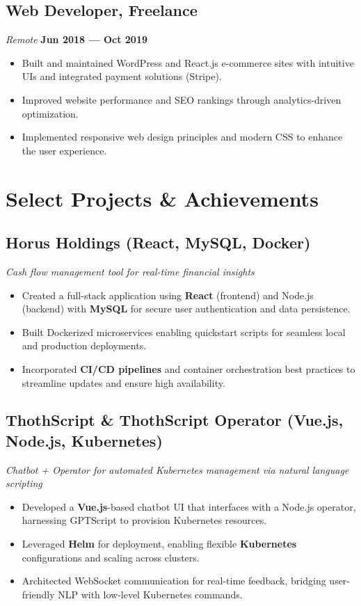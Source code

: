 \documentclass[a4paper,10pt]{article}
\begin{document}
\subsection*{Web Developer, Freelance}
\textit{Remote} \hfill \textbf{Jun 2018 — Oct 2019}
\begin{itemize}[leftmargin=1.5em]
    \item Built and maintained WordPress and React.js e-commerce sites with intuitive UIs and integrated payment solutions (Stripe).
    \item Improved website performance and SEO rankings through analytics-driven optimization.
    \item Implemented responsive web design principles and modern CSS to enhance the user experience.
\end{itemize}

\section*{Select Projects \& Achievements}

\subsection*{Horus Holdings (React, MySQL, Docker)}
\textit{Cash flow management tool for real-time financial insights}
\begin{itemize}[leftmargin=1.5em]
    \item Created a full-stack application using \textbf{React} (frontend) and Node.js (backend) with \textbf{MySQL} for secure user authentication and data persistence.
    \item Built Dockerized microservices enabling quickstart scripts for seamless local and production deployments.
    \item Incorporated \textbf{CI/CD pipelines} and container orchestration best practices to streamline updates and ensure high availability.
\end{itemize}

\subsection*{ThothScript \& ThothScript Operator (Vue.js, Node.js, Kubernetes)}
\textit{Chatbot + Operator for automated Kubernetes management via natural language scripting}
\begin{itemize}[leftmargin=1.5em]
    \item Developed a \textbf{Vue.js}-based chatbot UI that interfaces with a Node.js operator, harnessing GPTScript to provision Kubernetes resources.
    \item Leveraged \textbf{Helm} for deployment, enabling flexible \textbf{Kubernetes} configurations and scaling across clusters.
    \item Architected WebSocket communication for real-time feedback, bridging user-friendly NLP with low-level Kubernetes commands.
\end{itemize}
\end{document}
